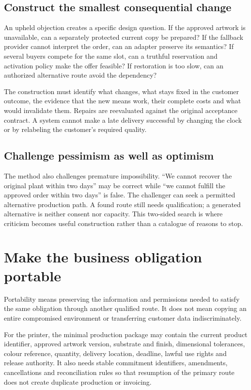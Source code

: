 \documentclass[11pt,a4paper]{article}
\begin{document}
\subsection{Construct the smallest consequential change}
An upheld objection creates a specific design question. If the approved artwork is unavailable, can a separately protected current copy be prepared? If the fallback provider cannot interpret the order, can an adapter preserve its semantics? If several buyers compete for the same slot, can a truthful reservation and activation policy make the offer feasible? If restoration is too slow, can an authorized alternative route avoid the dependency?

The construction must identify what changes, what stays fixed in the customer outcome, the evidence that the new means work, their complete costs and what would invalidate them. Repairs are reevaluated against the original acceptance contract. A system cannot make a late delivery successful by changing the clock or by relabeling the customer's required quality.

\subsection{Challenge pessimism as well as optimism}
The method also challenges premature impossibility. ``We cannot recover the original plant within two days'' may be correct while ``we cannot fulfill the approved order within two days'' is false. The challenger can seek a permitted alternative production path. A found route still needs qualification; a generated alternative is neither consent nor capacity. This two-sided search is where criticism becomes useful construction rather than a catalogue of reasons to stop.

\section{Make the business obligation portable}\label{sec:portable}
Portability means preserving the information and permissions needed to satisfy the same obligation through another qualified route. It does not mean copying an entire compromised environment or transferring customer data indiscriminately.

For the printer, the minimal production package may contain the current product identifier, approved artwork version, substrate and finish, dimensional tolerances, colour reference, quantity, delivery location, deadline, lawful use rights and release authority. It also needs stable commitment identifiers, amendments, cancellations and reconciliation rules so that resumption of the primary route does not create duplicate production or invoicing.
\end{document}
